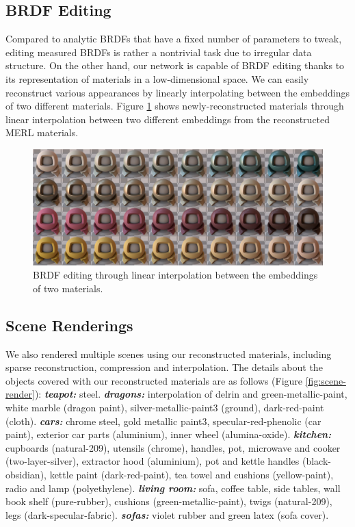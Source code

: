 \subsection{BRDF Editing}

Compared to analytic BRDFs that have a fixed number of parameters to tweak, editing measured BRDFs is rather a nontrivial task due to irregular data structure. On the other hand, our network is capable of BRDF editing thanks to its representation of materials in a low-dimensional space. We can easily reconstruct various appearances by linearly interpolating between the embeddings of two different materials. Figure \ref{fig:interpolation} shows newly-reconstructed materials through linear interpolation between two different embeddings from the reconstructed MERL materials. 


\begin{figure}[ht]
  \centering
   \includegraphics[width=0.9\linewidth]{Chapters/hyperbrdf-figs/interpolation_extended.pdf}

   \caption{BRDF editing through linear interpolation between the embeddings of two materials.}
   \label{fig:interpolation}
\end{figure}


\subsection{Scene Renderings}
We also rendered multiple scenes \cite{resources16} using our reconstructed materials, including sparse reconstruction, compression and interpolation. The details about the objects covered with our reconstructed materials are as follows (Figure \ref{fig:scene-render}): \textbf{\textit{teapot:}} steel. \textbf{\textit{dragons:}} interpolation of delrin and green-metallic-paint, white marble (dragon paint), silver-metallic-paint3 (ground), dark-red-paint (cloth). \textbf{\textit{cars:}} chrome steel, gold metallic paint3, specular-red-phenolic (car paint), exterior car parts (aluminium), inner wheel (alumina-oxide). \textbf{\textit{kitchen:}} cupboards (natural-209), utensils (chrome), handles, pot, microwave and cooker (two-layer-silver), extractor hood (aluminium), pot and kettle handles (black-obsidian), kettle paint (dark-red-paint), tea towel and cushions (yellow-paint), radio and lamp (polyethylene). \textbf{\textit{living room:}} sofa, coffee table, side tables, wall book shelf (pure-rubber), cushions (green-metallic-paint), twigs (natural-209), legs (dark-specular-fabric).
\textbf{\textit{sofas:}} violet rubber and green latex (sofa cover). 



